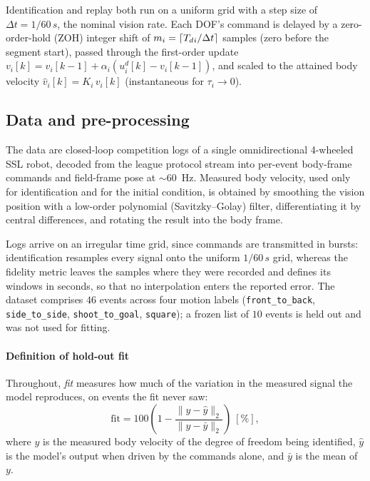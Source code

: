 Identification and replay both run on a uniform grid with a step size of $\Delta t = 1/60\,\si{s}$, the nominal vision rate. Each DOF's command is delayed by a zero-order-hold (ZOH) integer shift of $m_i = \lceil T_{d}{}_i/\Delta t\rceil$ samples (zero before the segment start), passed through the first-order update $v_i[k] = v_i[k-1] + \alpha_i(u^{d}_i[k] - v_i[k-1])$, and scaled to the attained body velocity $\hat v_i[k] = K_i\, v_i[k]$ (instantaneous for $\tau_i \to 0$). 

\subsection{Data and pre-processing}
\label{sec:method:data}
The data are closed-loop competition logs of a single omnidirectional 4-wheeled SSL robot, decoded from the league protocol stream into per-event body-frame commands and field-frame pose at $\sim$\SI{60}{Hz}. Measured body velocity, used only for identification and for the initial condition, is obtained by smoothing the vision position with a low-order polynomial (Savitzky--Golay) filter, differentiating it by central differences, and rotating the result into the body frame.

Logs arrive on an irregular time grid, since commands are transmitted in bursts: identification resamples every signal onto the uniform $1/60\,\si{s}$ grid, whereas the fidelity metric leaves the samples where they were recorded and defines its windows in seconds, so that no interpolation enters the reported error.
The dataset comprises $46$ events across four motion labels (\texttt{front\_to\_back}, \texttt{side\_to\_side}, \texttt{shoot\_to\_goal}, \texttt{square}); a frozen list of $10$ events is held out and was not used for fitting.

\paragraph{Definition of hold-out fit}
Throughout, \emph{fit} measures how much of the variation in the measured signal the model reproduces, on events the fit never saw:
\begin{equation}
  \mathrm{fit} = 100\left(1 -
  \frac{\lVert y - \hat{y}\rVert_2}{\lVert y - \bar{y}\rVert_2}\right)\ [\%],
  \label{eq:fit}
\end{equation}
where $y$ is the measured body velocity of the degree of freedom being identified, $\hat{y}$ is the model's output when driven by the commands alone, and $\bar{y}$ is the mean of $y$.

